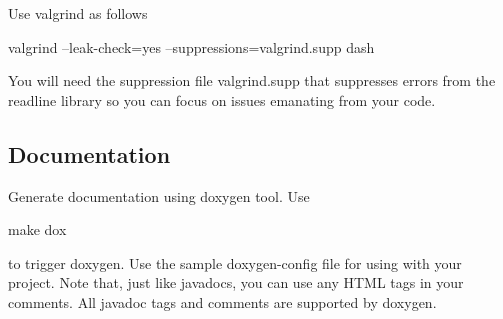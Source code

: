\begin{DoxyPre}Use valgrind as follows\end{DoxyPre}



\begin{DoxyPre}valgrind --leak-check=yes --suppressions=valgrind.supp dash\end{DoxyPre}



\begin{DoxyPre}You will need the suppression file valgrind.supp that suppresses errors from
the readline library so you can focus on issues emanating from your code.\end{DoxyPre}



\begin{DoxyPre}\subsection*{Documentation
}\end{DoxyPre}



\begin{DoxyPre}\end{DoxyPre}



\begin{DoxyPre}Generate documentation using doxygen tool. Use\end{DoxyPre}



\begin{DoxyPre}make dox\end{DoxyPre}



\begin{DoxyPre}to trigger doxygen. Use the sample doxygen-config file for using with your
project. Note that, just like javadocs, you can use any HTML tags in your
comments. All javadoc tags and comments are supported by doxygen.
\end{DoxyPre}
 